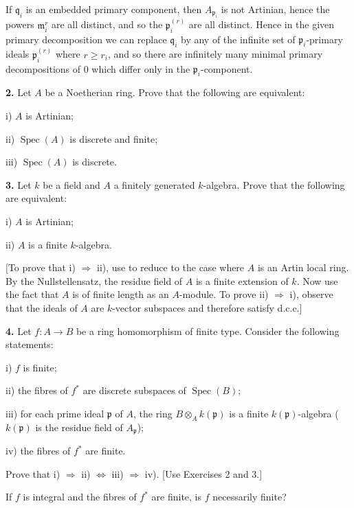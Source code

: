 If \(\mathfrak q_i\) is an embedded primary component, then \(A_{\mathfrak p_i}\) is not Artinian, hence the powers \(\mathfrak m_i^r\) are all distinct, and so the \(\mathfrak p_i^{(r)}\) are all distinct. Hence in the given primary decomposition we can replace \(\mathfrak q_i\) by any of the infinite set of \(\mathfrak p_i\)-primary ideals \(\mathfrak p_i^{(r)}\) where \(r\geq r_i\), and so there are infinitely many minimal primary decompositions of 0 which differ only in the \(\mathfrak p_i\)-component.

\noindent\textbf{2.} Let \(A\) be a Noetherian ring. Prove that the following are equivalent:

i) \(A\) is Artinian;

ii) \(\operatorname{Spec}(A)\) is discrete and finite;

iii) \(\operatorname{Spec}(A)\) is discrete.

\noindent\textbf{3.} Let \(k\) be a field and \(A\) a finitely generated \(k\)-algebra. Prove that the following are equivalent:

i) \(A\) is Artinian;

ii) \(A\) is a finite \(k\)-algebra.

[To prove that i) \(\Rightarrow\) ii), use  to reduce to the case where \(A\) is an Artin local ring. By the Nullstellensatz, the residue field of \(A\) is a finite extension of \(k\). Now use the fact that \(A\) is of finite length as an \(A\)-module. To prove ii) \(\Rightarrow\) i), observe that the ideals of \(A\) are \(k\)-vector subspaces and therefore satisfy d.c.c.]

\noindent\textbf{4.} Let \(f:A\to B\) be a ring homomorphism of finite type. Consider the following statements:

i) \(f\) is finite;

ii) the fibres of \(f^*\) are discrete subspaces of \(\operatorname{Spec}(B)\);

iii) for each prime ideal \(\mathfrak p\) of \(A\), the ring \(B\otimes_A k(\mathfrak p)\) is a finite \(k(\mathfrak p)\)-algebra (\(k(\mathfrak p)\) is the residue field of \(A_\mathfrak p\));

iv) the fibres of \(f^*\) are finite.

Prove that i) \(\Rightarrow\) ii) \(\Longleftrightarrow\) iii) \(\Rightarrow\) iv). [Use Exercises 2 and 3.]

If \(f\) is integral and the fibres of \(f^*\) are finite, is \(f\) necessarily finite?

